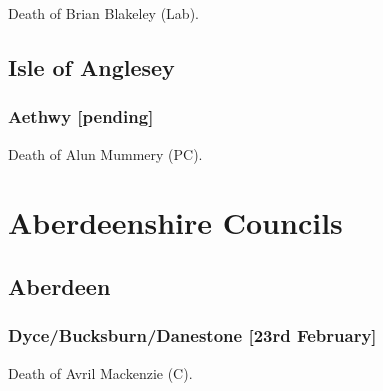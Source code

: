 \documentclass[a4paper,openany]{book}
\begin{document}
\begin{resultsiii}

Death of Brian Blakeley (Lab).

\subsection*{Isle of Anglesey}

\subsubsection*{Aethwy \hspace*{\fill}\nolinebreak[1]%
	\enspace\hspace*{\fill}
	[pending]}


Death of Alun Mummery (PC).

\section{Aberdeenshire Councils}

\subsection*{Aberdeen}

\subsubsection*{Dyce\slash Bucksburn\slash Danestone \hspace*{\fill}\nolinebreak[1]%
	\enspace\hspace*{\fill}
	[23rd February]}


Death of Avril Mackenzie (C).

%
%


\end{resultsiii}
\end{document}
